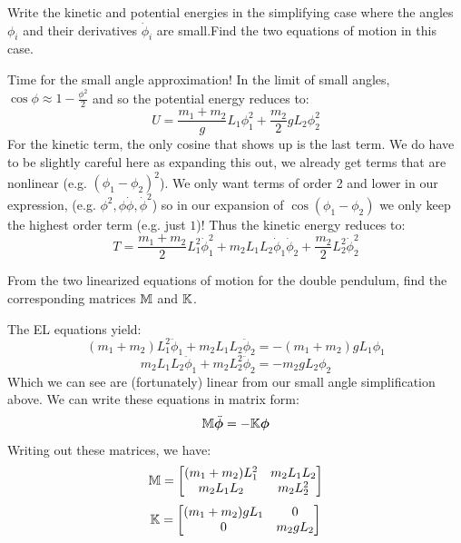 \begin{p}
Write the kinetic and potential energies in the simplifying case where the angles $\phi_i$ and their derivatives $\dot{\phi}_i$ are small.Find the two equations of motion in this case. 
\end{p}
\begin{s}
Time for the small angle approximation! In the limit of small angles, $\cos\phi \approx 1 - \frac{\phi^2}{2}$ and so the potential energy reduces to:
\[U = \frac{m_1 + m_2}gL_1\phi_1^2 + \frac{m_2}{2}gL_2\phi^2_2\]
For the kinetic term, the only cosine that shows up is the last term. We do have to be slightly careful here as expanding this out, we already get terms that are nonlinear (e.g. $(\phi_1 - \phi_2)^2$). We only want terms of order 2 and lower in our expression, (e.g. $\phi^2, \phi\dot{\phi}, \dot{\phi}^2$) so in our expansion of $\cos(\phi_1 - \phi_2)$ we only keep the highest order term (e.g. just $1$)! Thus the kinetic energy reduces to:
\[T = \frac{m_1 + m_2}{2}L_1^2\dot{\phi}_1^2 + m_2L_1L_2\dot{\phi}_1\dot{\phi}_2 + \frac{m_2}{2}L_2^2\dot{\phi}_2^2\]
\end{s}

\begin{p}
From the two linearized equations of motion for the double pendulum, find the corresponding matrices $\mathbb{M}$ and $\mathbb{K}$.
\end{p}
\begin{s}
The EL equations yield:
\[(m_1 + m_2)L_1^2\ddot{\phi}_1 + m_2L_1L_2\ddot{\phi}_2 = -(m_1 + m_2)gL_1\phi_1\]
\[m_2L_1L_2\ddot{\phi}_1 + m_2L_2^2\ddot{\phi}_2 = -m_2gL_2\phi_2\]
Which we can see are (fortunately) linear from our small angle simplification above. We can write these equations in matrix form:
\[\mathbb{M}\ddot{\bm{\phi}} = -\mathbb{K}\bm{\phi}\]
Writing out these matrices, we have:
\[\mathbb{M} = \begin{bmatrix}
(m_1 + m_2)L_1^2 & m_2L_1L_2
\\ m_2L_1L_2 & m_2L_2^2\end{bmatrix}\]
\[\mathbb{K} = \begin{bmatrix}(m_1 + m_2)gL_1 & 0 
\\ 0 & m_2gL_2\end{bmatrix}\]

\end{s}

